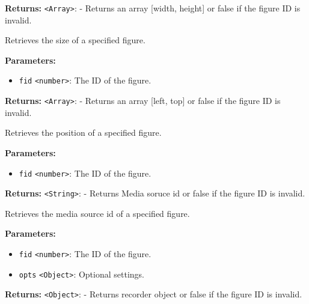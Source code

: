 \documentclass[12pt,a4paper]{article}
\begin{document}
\noindent \textbf{Returns:} \texttt{<Array>}: - Returns an array [width, height] or false if the figure ID is invalid.

\noindent Retrieves the size of a specified figure.

\vspace{5mm}
\noindent {}


\noindent \textbf{Parameters:}
\begin{itemize}
  \item \texttt{fid} \texttt{<number>}: The ID of the figure.
\end{itemize}

\noindent \textbf{Returns:} \texttt{<Array>}: - Returns an array [left, top] or false if the figure ID is invalid.

\noindent Retrieves the position of a specified figure.

\vspace{5mm}
\noindent {}


\noindent \textbf{Parameters:}
\begin{itemize}
  \item \texttt{fid} \texttt{<number>}: The ID of the figure.
\end{itemize}

\noindent \textbf{Returns:} \texttt{<String>}: - Returns Media soruce id or false if the figure ID is invalid.

\noindent Retrieves the media source id of a specified figure.

\vspace{5mm}
\noindent {}


\noindent \textbf{Parameters:}
\begin{itemize}
  \item \texttt{fid} \texttt{<number>}: The ID of the figure.
  \item \texttt{opts} \texttt{<Object>}: Optional settings.
\end{itemize}

\noindent \textbf{Returns:} \texttt{<Object>}: - Returns recorder object or false if the figure ID is invalid.
\end{document}
